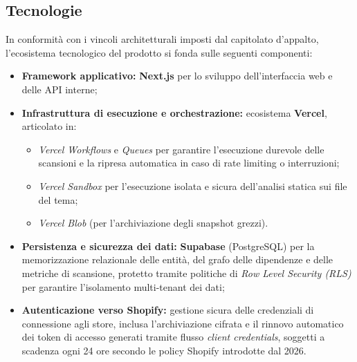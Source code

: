 \subsection{Tecnologie}
In conformità con i vincoli architetturali imposti dal capitolato d'appalto, l'ecosistema tecnologico del prodotto si fonda sulle seguenti componenti:
\begin{itemize}
    \item \textbf{Framework applicativo:} \textbf{Next.js} per lo sviluppo dell'interfaccia web e delle API interne;
    \item \textbf{Infrastruttura di esecuzione e orchestrazione:} ecosistema \textbf{Vercel}, articolato in:
    \begin{itemize}
        \item \textit{Vercel Workflows} e \textit{Queues} per garantire l'esecuzione durevole delle scansioni e la ripresa automatica in caso di rate limiting o interruzioni;
        \item \textit{Vercel Sandbox} per l'esecuzione isolata e sicura dell'analisi statica sui file del tema;
        \item \textit{Vercel Blob} (per l'archiviazione degli snapshot grezzi).
    \end{itemize}
    \item \textbf{Persistenza e sicurezza dei dati:} \textbf{Supabase} (PostgreSQL) per la memorizzazione relazionale delle entità, del grafo delle dipendenze e delle metriche di scansione, protetto tramite politiche di \textit{Row Level Security (RLS)} per garantire l'isolamento multi-tenant dei dati;
    \item \textbf{Autenticazione verso Shopify:} gestione sicura delle credenziali di connessione agli store, inclusa l'archiviazione cifrata e il rinnovo automatico dei token di accesso generati tramite flusso \textit{client credentials}, soggetti a scadenza ogni 24 ore secondo le policy Shopify introdotte dal 2026.
\end{itemize}
